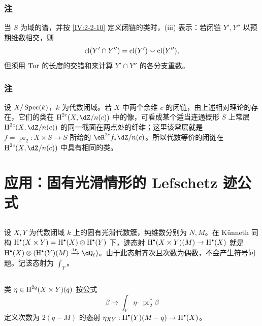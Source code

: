 \subsubsection{注}\label{IV:2-3-9}
当 $S$ 为域的谱，并按 \ref{IV:2-2-10} 定义闭链的类时，(iii) 表示：若闭链 $Y',Y''$ 以预期维数相交，则
\[
\operatorname{cl}(Y'\cap Y'')=\operatorname{cl}(Y')\smallsmile\operatorname{cl}(Y''),
\]
但须用 $\operatorname{Tor}$ 的长度的交错和来计算 $Y'\cap Y''$ 的各分支重数。

\subsubsection{注}\label{IV:2-3-10}
设 $X/\operatorname{Spec}(k)$，$k$ 为代数闭域。若 $X$ 中两个余维 $c$ 的闭链，由上述相对理论的存在，它们的类在 $\h^{2c}(X,\dZ/n(c))$ 中的像，可看成某个适当连通概形 $S$ 上常层 $\h^{2c}(X,\dZ/n(c))$ 的同一截面在两点处的纤维；这里该常层就是 $f=\operatorname{pr}_2:X\times S\to S$ 所给的 $\eR^{2c}f_*\dZ/n(c)$。所以代数等价的闭链在 $\h^{2c}(X,\dZ/n(c))$ 中具有相同的类。

\section{应用：固有光滑情形的 Lefschetz 迹公式}\label{IV:3}
\subsection{}\label{IV:3-1}
设 $X,Y$ 为代数闭域 $k$ 上的固有光滑代数簇，纯维数分别为 $N,M$。在 Künneth 同构 $\h^\bullet(X\times Y)=\h^\bullet(X)\otimes\h^\bullet(Y)$ 下，迹态射 $\h^\bullet(X\times Y)(M)\to\h^\bullet(X)$ 就是 $\h^\bullet(X)\otimes(\h^\bullet(Y)(M)\xrightarrow{\tr}\dQ_\ell)$。由于此态射齐次且次数为偶数，不会产生符号问题。记该态射为 $\int_Y$。

\subsection{}\label{IV:3-2}
类 $\eta\in\operatorname{H}^{2q}(X\times Y)(q)$ 按公式
\[
\beta\longmapsto\int_Y\eta\cdot\operatorname{pr}_2^*\beta
\]
定义次数为 $2(q-M)$ 的态射 $\eta_{XY}:\h^\bullet(Y)(M-q)\to\h^\bullet(X)$。

